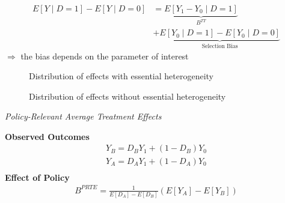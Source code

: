 \begin{frame}
	\begin{align*}
		E[Y\mid D = 1] - E[Y\mid D = 0] & = \underbrace{E[Y_1 - Y_0\mid D = 1]}_{B^{TT}} \\
		& + \underbrace{E[Y_0\mid D= 1]- E[Y_0 \mid D = 0]}_{\text{Selection Bias}}
	\end{align*}
	\(\Rightarrow\) the bias depends on the parameter of interest
\end{frame}
\begin{frame}
	\begin{figure}\caption{Distribution of effects with essential heterogeneity}
	\end{figure}
\end{frame}
\begin{frame}
	\begin{figure}\caption{Distribution of effects without essential heterogeneity}
	\end{figure}
\end{frame}
\begin{frame}\begin{center}
		\LARGE\textit{Policy-Relevant Average Treatment Effects}
\end{center}\end{frame}
\begin{frame}
	\textbf{Observed Outcomes}
	\begin{align*}
		Y_B = D_B Y_1 + (1 - D_B) Y_0 \\
		Y_A = D_A Y_1 + (1 - D_A) Y_0 \\
	\end{align*}
	\textbf{Effect of Policy}
	\begin{align*}
		B^{PRTE} = \frac{1}{E[D_A] - E[D_B]} (E[Y_A] - E[Y_B])
	\end{align*}
\end{frame}
